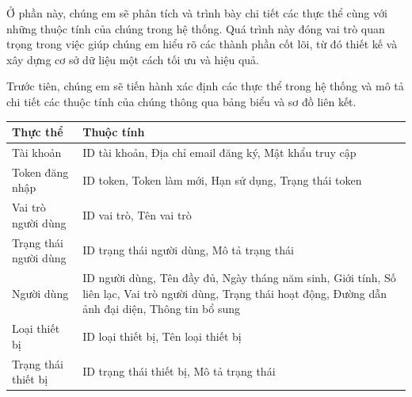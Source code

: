 Ở phần này, chúng em sẽ phân tích và trình bày chi tiết các thực thể cùng với những thuộc tính của chúng trong hệ thống.
Quá trình này đóng vai trò quan trọng trong việc giúp chúng em hiểu rõ các thành phần cốt lõi, từ đó thiết kế và xây dựng cơ sở dữ liệu một cách tối ưu và hiệu quả.

Trước tiên, chúng em sẽ tiến hành xác định các thực thể trong hệ thống và mô tả chi tiết các thuộc tính của chúng thông qua bảng biểu và sơ đồ liên kết.

\begin{table}[H]
	\raggedright
	\begin{tabularx}{\textwidth}{|p{4.5cm}|X|}
		\hline
		\bfseries Thực thể                & \bfseries Thuộc tính                                                                                                    \\ \hline
		Tài khoản                         &
		ID tài khoản, Địa chỉ email đăng ký, Mật khẩu truy cập                                                                                                      \\
		\hline
		Token đăng nhập                   &
		ID token, Token làm mới, Hạn sử dụng, Trạng thái token                                                                                                      \\
		\hline
		Vai trò người dùng                &
		ID vai trò, Tên vai trò                                                                                                                                     \\
		\hline
		Trạng thái người dùng             &
		ID trạng thái người dùng, Mô tả trạng thái                                                                                                                  \\
		\hline
		Người dùng                        &
		ID người dùng, Tên đầy đủ, Ngày tháng năm sinh, Giới tính, Số liên lạc, Vai trò người dùng, Trạng thái hoạt động, Đường dẫn ảnh đại diện, Thông tin bổ sung \\
		\hline
		Loại thiết bị                     &
		ID loại thiết bị, Tên loại thiết bị                                                                                                                         \\
		\hline
		Trạng thái thiết bị               &
		ID trạng thái thiết bị, Mô tả trạng thái                                                                                                                    \\

\end{tabularx}
\end{table}
